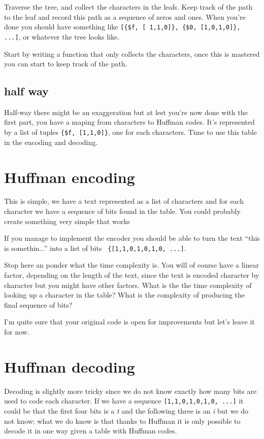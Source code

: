 \documentclass[a4paper,11pt]{article}
\begin{document}
Traverse the tree, and collect the characters in the leafs. Keep track
of the path to the leaf and record this path as a sequence of zeros
and ones. When you're done you should have something like
{\tt [\{\$f, [ 1,1,0]\}, \{\$0, [1,0,1,0]\}, ...]}, or whatever the tree
looks like.

Start by writing a function that only collects the characters, once
this is mastered you can start to keep track of the path.

\subsection{half way}

Half-way there might be an exaggeration but at lest you're now done
with the first part, you have a maping from characters to Huffman
codes. It's represented by a list of tuples {\tt \{\$f, [1,1,0]\}},
one for each characters. Time to use this table in the encoding and
decoding.

\section{Huffman encoding}

This is simple, we have a text represented as a list of characters and
for each character we have a sequence of bits found in the table. You
could probably create something very simple that works 

If you manage to implement the encoder you should be able to turn the
text ``this is somethin...'' into a list of bits {\tt
  \{[1,1,0,1,0,1,0, ...]}.

Stop here an ponder what the time complexity is. You will of course
have a linear factor, depending on the length of the text, since the
text is encoded character by character but you might have other
factors. What is the the time complexity of looking up a character in
the table? What is the complexity of producing the final sequence of bits?

I'm quite sure that your original code is open for improvements but
let's leave it for now.

\section{Huffman decoding}

Decoding is slightly more tricky since we do not know exactly how many
bits are used to code each character. If we have a sequence
{\tt [1,1,0,1,0,1,0, ...]} it could be that the first four bits is a
  {\em t} and the following three is an {\em i} but we do not know;
  what we do know is that thanks to Huffman it is only possible to
  decode it in one way given a table with Huffman codes.
\end{document}
